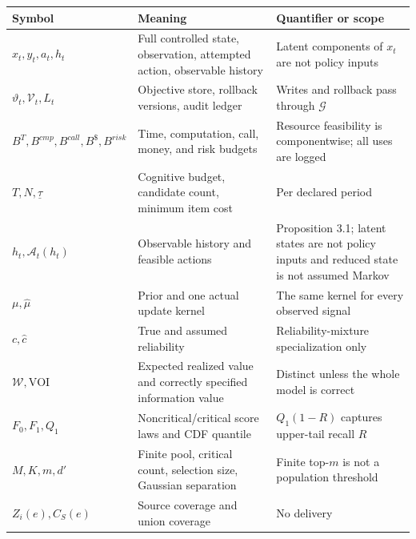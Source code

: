 \documentclass[
  11pt]{article}
\begin{document}
\begin{longtable}[]{@{}
  >{\raggedright\arraybackslash}p{}
  >{\raggedright\arraybackslash}p{}
  >{\raggedright\arraybackslash}p{}@{}}
\toprule\noalign{}
\begin{minipage}[b]{\linewidth}\raggedright
Symbol
\end{minipage} & \begin{minipage}[b]{\linewidth}\raggedright
Meaning
\end{minipage} & \begin{minipage}[b]{\linewidth}\raggedright
Quantifier or scope
\end{minipage} \\
\midrule\noalign{}
\endhead
\bottomrule\noalign{}
\endlastfoot
\(x_t,y_t,a_t,h_t\) & Full controlled state, observation, attempted
action, observable history & Latent components of \(x_t\) are not policy
inputs \\
\(\vartheta_t,\mathcal V_t,L_t\) & Objective store, rollback versions,
audit ledger & Writes and rollback pass through \(\mathcal G\) \\
\(B^T,B^{cmp},B^{call},B^{\$},B^{risk}\) & Time, computation, call,
money, and risk budgets & Resource feasibility is componentwise; all
uses are logged \\
\(T,N,\underline\tau\) & Cognitive budget, candidate count, minimum item
cost & Per declared period \\
\(h_t,\mathcal A_t(h_t)\) & Observable history and feasible actions &
Proposition 3.1; latent states are not policy inputs and reduced state
is not assumed Markov \\
\(\mu,\widehat\mu\) & Prior and one actual update kernel & The same
kernel for every observed signal \\
\(c,\hat c\) & True and assumed reliability & Reliability-mixture
specialization only \\
\(\mathcal W,\mathrm{VOI}\) & Expected realized value and correctly
specified information value & Distinct unless the whole model is
correct \\
\(F_0,F_1,Q_1\) & Noncritical/critical score laws and CDF quantile &
\(Q_1(1-R)\) captures upper-tail recall \(R\) \\
\(M,K,m,d'\) & Finite pool, critical count, selection size, Gaussian
separation & Finite top-\(m\) is not a population threshold \\
\(Z_i(e),C_S(e)\) & Source coverage and union coverage & No delivery

\end{longtable}
\end{document}
